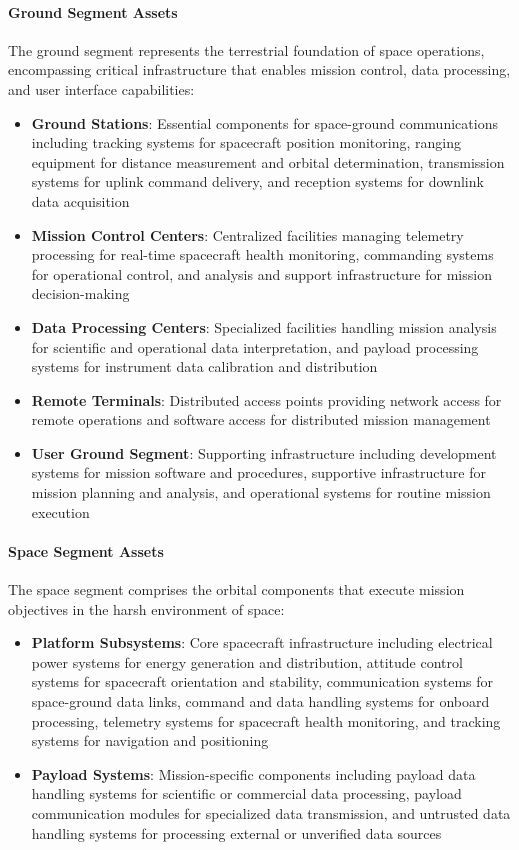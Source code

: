 \documentclass[binding=0.6cm]{sapthesis}
\begin{document}
\paragraph{Ground Segment Assets}

The ground segment represents the terrestrial foundation of space operations, encompassing critical infrastructure that enables mission control, data processing, and user interface capabilities:

\begin{itemize}
    \item \textbf{Ground Stations}: Essential components for space-ground communications including tracking systems for spacecraft position monitoring, ranging equipment for distance measurement and orbital determination, transmission systems for uplink command delivery, and reception systems for downlink data acquisition
    \item \textbf{Mission Control Centers}: Centralized facilities managing telemetry processing for real-time spacecraft health monitoring, commanding systems for operational control, and analysis and support infrastructure for mission decision-making
    \item \textbf{Data Processing Centers}: Specialized facilities handling mission analysis for scientific and operational data interpretation, and payload processing systems for instrument data calibration and distribution
    \item \textbf{Remote Terminals}: Distributed access points providing network access for remote operations and software access for distributed mission management
    \item \textbf{User Ground Segment}: Supporting infrastructure including development systems for mission software and procedures, supportive infrastructure for mission planning and analysis, and operational systems for routine mission execution
\end{itemize}

\paragraph{Space Segment Assets}

The space segment comprises the orbital components that execute mission objectives in the harsh environment of space:

\begin{itemize}
    \item \textbf{Platform Subsystems}: Core spacecraft infrastructure including electrical power systems for energy generation and distribution, attitude control systems for spacecraft orientation and stability, communication systems for space-ground data links, command and data handling systems for onboard processing, telemetry systems for spacecraft health monitoring, and tracking systems for navigation and positioning
    \item \textbf{Payload Systems}: Mission-specific components including payload data handling systems for scientific or commercial data processing, payload communication modules for specialized data transmission, and untrusted data handling systems for processing external or unverified data sources
\end{itemize}
\end{document}
